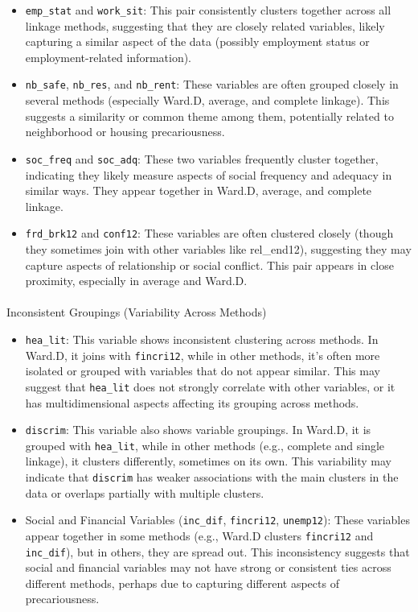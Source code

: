 \documentclass[
]{article}
\makeatletter
\let\oldparagraph\paragraph
\renewcommand{\paragraph}{
    \@ifstar
      \xxxParagraphStar
      \xxxParagraphNoStar
  }
\newcommand{\xxxParagraphStar}[1]{\oldparagraph*{#1}\mbox{}}
\newcommand{\xxxParagraphNoStar}[1]{\oldparagraph{#1}\mbox{}}
\makeatother
\begin{document}
\begin{itemize}
\item
  \texttt{emp\_stat} and \texttt{work\_sit}: This pair consistently
  clusters together across all linkage methods, suggesting that they are
  closely related variables, likely capturing a similar aspect of the
  data (possibly employment status or employment-related information).
\item
  \texttt{nb\_safe}, \texttt{nb\_res}, and \texttt{nb\_rent}: These
  variables are often grouped closely in several methods (especially
  Ward.D, average, and complete linkage). This suggests a similarity or
  common theme among them, potentially related to neighborhood or
  housing precariousness.
\item
  \texttt{soc\_freq} and \texttt{soc\_adq}: These two variables
  frequently cluster together, indicating they likely measure aspects of
  social frequency and adequacy in similar ways. They appear together in
  Ward.D, average, and complete linkage.
\item
  \texttt{frd\_brk12} and \texttt{conf12}: These variables are often
  clustered closely (though they sometimes join with other variables
  like rel\_end12), suggesting they may capture aspects of relationship
  or social conflict. This pair appears in close proximity, especially
  in average and Ward.D.
\end{itemize}

\paragraph{Inconsistent Groupings (Variability Across
Methods)}\label{inconsistent-groupings-variability-across-methods}

\begin{itemize}
\item
  \texttt{hea\_lit}: This variable shows inconsistent clustering across
  methods. In Ward.D, it joins with \texttt{fincri12}, while in other
  methods, it's often more isolated or grouped with variables that do
  not appear similar. This may suggest that \texttt{hea\_lit} does not
  strongly correlate with other variables, or it has multidimensional
  aspects affecting its grouping across methods.
\item
  \texttt{discrim}: This variable also shows variable groupings. In
  Ward.D, it is grouped with \texttt{hea\_lit}, while in other methods
  (e.g., complete and single linkage), it clusters differently,
  sometimes on its own. This variability may indicate that
  \texttt{discrim} has weaker associations with the main clusters in the
  data or overlaps partially with multiple clusters.
\item
  Social and Financial Variables (\texttt{inc\_dif}, \texttt{fincri12},
  \texttt{unemp12}): These variables appear together in some methods
  (e.g., Ward.D clusters \texttt{fincri12} and \texttt{inc\_dif}), but
  in others, they are spread out. This inconsistency suggests that
  social and financial variables may not have strong or consistent ties
  across different methods, perhaps due to capturing different aspects
  of precariousness.
\end{itemize}
\end{document}
